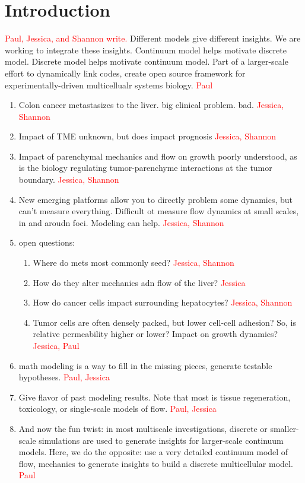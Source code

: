 \documentclass[smallextended,natbib]{svjour3}
\newcommand{\red}[1]{\textcolor{red}{#1}}
\begin{document}
\section{Introduction}
\red{Paul, Jessica, and Shannon write.}
Different models give different insights. We are working to integrate these insights. 
Continuum model helps motivate discrete model. 
Discrete model helps motivate continuum model. 
Part of a larger-scale effort to dynamically link codes, create open source framework 
for experimentally-driven multicellualr systems biology.  \red{Paul}

\begin{enumerate}
\item 
Colon cancer metastasizes to the liver. big clinical problem. bad.  \red{Jessica, Shannon}
\item 
Impact of TME unknown, but does impact prognosis \red{Jessica, Shannon}
\item 
Impact of parenchymal mechanics and flow on growth poorly understood, as is the biology regulating tumor-parenchyme interactions 
at the tumor boundary. \red{Jessica, Shannon}
\item 
New emerging platforms allow you to directly problem some dynamics, but can't measure everything. Difficult ot measure flow dynamics at 
small scales, in and aroudn foci. Modeling can help.  \red{Jessica, Shannon}
\item 
open questions: 
\begin{enumerate}
\item 
Where do mets most commonly seed? \red{Jessica, Shannon}
\item
How do they alter mechanics adn flow of the liver? \red{Jessica}
\item 
How do cancer cells impact surrounding hepatocytes? \red{Jessica, Shannon}
\item 
Tumor cells are often densely packed, but lower cell-cell adhesion? So, is relative permeability higher or lower? Impact on growth 
dynamics? \red{Jessica, Paul}
\end{enumerate}
\item 
math modeling is a way to fill in the missing pieces, generate testable hypotheses. \red{Paul, Jessica}
\item 
Give flavor of past modeling results. Note that most is tissue regeneration, toxicology, or single-scale models of flow.  
\red{Paul, Jessica}
\item 
And now the fun twist: in most multiscale investigations, discrete or smaller-scale simulations are used to generate insights for 
larger-scale continuum models. Here, we do the opposite: use a very detailed continuum model of flow, mechanics to generate insights 
to build a discrete multicellular model. \red{Paul}
\end{enumerate}
\end{document}
